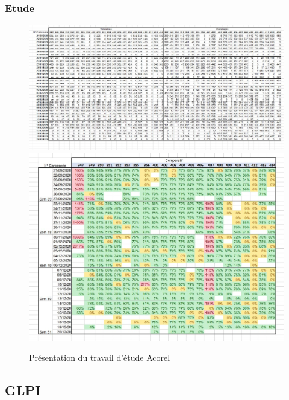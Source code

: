 \documentclass{article}
\begin{document}
        \subsubsection{Etude}
            \label{Acorel_etudes}
            \begin{figure}[!h]
                \centering
                \includegraphics[scale = 0.5]{Images/Acorel_bilan.JPG}
                \includegraphics[scale = 0.7]{Images/Acorel_comparatif.JPG}
                \caption{Présentation du travail d'étude Acorel}
            \end{figure}

    \pagebreak
    \subsection{GLPI}
\end{document}
